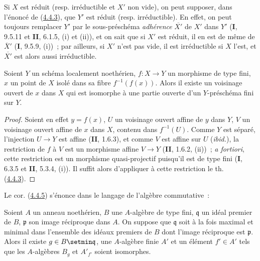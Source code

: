 \begin{remark}[4.4.4]
\label{III.4.4.4-fr}
Si $X$ est réduit (resp. irréductible et $X'$ non vide), on peut supposer,
dans l'énoncé de (\hyperref[III.4.4.3-fr]{4.4.3}), que $Y'$ est réduit (resp.
irréductible). En effet, on peut toujours remplacer $Y'$ par le
sous-préschéma \emph{adhérence} $\overline{X'}$ de $X'$ dans $Y'$ (\textbf{I}, 9.5.11 et
\textbf{II}, 6.1.5, (i) et (ii)), et on sait que si $X'$ est réduit, il en est de même
de $\overline{X}'$ (\textbf{I}, 9.5.9, (i))~; par ailleurs, si $X'$ n'est pas vide, il
est irréductible si $X$ l'est, et $\overline{X'}$ est alors aussi
irréductible.
\end{remark}

\begin{corollary}[4.4.5]
\label{III.4.4.5-fr}
Soient $Y$ un schéma localement noethérien, $f:X\to Y$ un morphisme de type
fini, $x$ un point de $X$ isolé dans sa fibre $f^{-1}(f(x))$. Alors il existe
un voisinage ouvert de $x$ dans $X$ qui est isomorphe à une partie ouverte
d'un $Y$-préschéma fini sur $Y$.
\end{corollary}

\begin{proof}
Soient en effet $y=f(x)$, $U$ un voisinage ouvert affine de $y$ dans $Y$,
$V$ un voisinage ouvert affine de $x$ dans $X$, contenu dans $f^{-1}(U)$.
Comme $Y$ est séparé, l'injection $U\to Y$ est affine (\textbf{II}, 1.6.3), et comme
$V$ est affine sur $U$ (\emph{ibid.}), la restriction de $f$ à $V$ est un
morphisme affine $V\to Y$ (\textbf{II}, 1.6.2, (ii))~; \emph{a fortiori}, cette
restriction est un morphisme quasi-projectif puisqu'il est de type fini
(\textbf{I}, 6.3.5 et \textbf{II}, 5.3.4, (i)). Il suffit alors d'appliquer à cette restriction
le th. (\hyperref[III.4.4.3-fr]{4.4.3}).
\end{proof}

Le cor. (\hyperref[III.4.4.5-fr]{4.4.5}) s'énonce dans le langage de
l'algèbre commutative~:


\begin{corollary}[4.4.6]
\label{III.4.4.6-fr}
Soient $A$ un anneau noethérien, $B$ une $A$-algèbre de type fini,
$\mathfrak q$ un idéal premier de $B$, $\mathfrak p$ son image réciproque
dans $A$. On suppose que $\mathfrak q$ soit à la fois maximal et minimal dans
l'ensemble des idéaux premiers de $B$ dont l'image réciproque est
$\mathfrak p$. Alors il existe $g\in B\setmin\mathfrak q$, une $A$-algèbre finie
$A'$ et un élément $f'\in A'$ tels que les $A$-algèbres $B_g$ et $A'_{f'}$
soient isomorphes.
\end{corollary}

